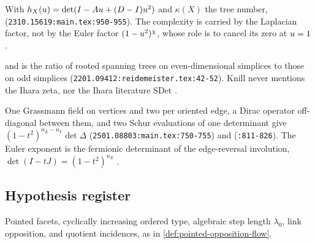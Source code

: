 \begin{citedfact}
\label{cit:hashimoto-hprime}
\sloppy
With $h_X(u) = \det(I-Au+(D-I)u^2)$ and $\kappa(X)$ the tree number,
{\small\texttt{}}
(\texttt{2310.15619:main.tex:950-955}). The complexity is carried by the
Laplacian factor, not by the Euler factor $(1-u^2)^{\chi}$, whose role is to
cancel its zero at $u = 1$ \cite{vallieres2023spanning}.
\end{citedfact}

\begin{citedfact}
\label{cit:knill-sdet}
\sloppy
{\small\texttt{}}
and is the ratio of rooted spanning trees on even-dimensional simplices to those
on odd simplices (\texttt{2201.09412:reidemeister.tex:42-52}). Knill never
mentions the Ihara zeta, nor the Ihara literature $\mathrm{SDet}$
\cite{knill2022torsion}.
\end{citedfact}

\begin{citedfact}
\label{cit:mo-dirac}
\sloppy
One Grassmann field on vertices and two per oriented edge, a Dirac operator
off-diagonal between them, and two Schur evaluations of one determinant give
$(1-t^2)^{n_E-n_V}\det\Delta$ (\texttt{2501.08803:main.tex:750-755}) and %
{\small\texttt{}}
(\texttt{:811-826}). The Euler exponent is the fermionic determinant of the
edge-reversal involution, $\det(I-tJ) = (1-t^2)^{n_E}$
\cite{matsuura2025fermions}.
\end{citedfact}

\subsection{Hypothesis register}
\begin{assumption}
\label{asm:h-point}
Pointed facets, cyclically increasing ordered type, algebraic step length
$\lambda_0$, link opposition, and quotient incidences, as in
\cref{def:pointed-opposition-flow}.
\end{assumption}

